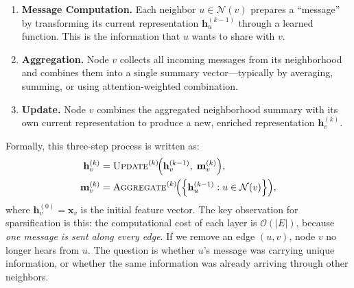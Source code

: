 \documentclass[conference]{IEEEtran}
\begin{document}
\begin{enumerate}
    \item \textbf{Message Computation.} Each neighbor $u \in \mathcal{N}(v)$ prepares a ``message'' by transforming its current representation $\mathbf{h}_u^{(k-1)}$ through a learned function. This is the information that $u$ wants to share with $v$.
    \item \textbf{Aggregation.} Node $v$ collects all incoming messages from its neighborhood and combines them into a single summary vector---typically by averaging, summing, or using attention-weighted combination.
    \item \textbf{Update.} Node $v$ combines the aggregated neighborhood summary with its own current representation to produce a new, enriched representation $\mathbf{h}_v^{(k)}$.
\end{enumerate}

Formally, this three-step process is written as:
\begin{equation}
\begin{split}
    \mathbf{h}_v^{(k)} &= \textsc{Update}^{(k)}\!\Big(\mathbf{h}_v^{(k-1)},\; \mathbf{m}_v^{(k)}\Big), \\
    \mathbf{m}_v^{(k)} &= \textsc{Aggregate}^{(k)}\!\Big(\!\left\{\mathbf{h}_u^{(k-1)} : u \in \mathcal{N}(v)\right\}\!\Big),
\end{split}
    \label{eq:gnn_layer}
\end{equation}
where $\mathbf{h}_v^{(0)} = \mathbf{x}_v$ is the initial feature vector. The key observation for sparsification is this: the computational cost of each layer is $\mathcal{O}(|E|)$, because \emph{one message is sent along every edge}. If we remove an edge $(u, v)$, node $v$ no longer hears from $u$. The question is whether $u$'s message was carrying unique information, or whether the same information was already arriving through other neighbors.
\end{document}

